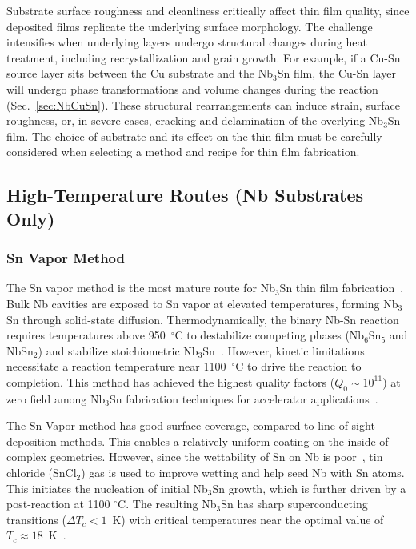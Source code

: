     Substrate surface roughness and cleanliness critically affect thin film quality, since deposited films replicate the underlying surface morphology. The challenge intensifies when underlying layers undergo structural changes during heat treatment, including recrystallization and grain growth. For example, if a Cu-Sn source layer sits between the Cu substrate and the Nb$_3$Sn film, the Cu-Sn layer will undergo phase transformations and volume changes during the reaction (Sec.~\ref{sec:NbCuSn}). These structural rearrangements can induce strain, surface roughness, or, in severe cases, cracking and delamination of the overlying Nb$_3$Sn film. The choice of substrate and its effect on the thin film must be carefully considered when selecting a method and recipe for thin film fabrication.
    
    \subsection{High-Temperature Routes (Nb Substrates Only)}
    
    \subsubsection{Sn Vapor Method} \label{sec:Snvapordetail}

    The Sn vapor method is the most mature route for Nb$_3$Sn thin film fabrication~\cite{peinigerNb3SnSUPERCONDUCTINGACCELERATORS1989,posenMeasurementHighQuality2022}. Bulk Nb cavities are exposed to Sn vapor at elevated temperatures, forming Nb$_3$Sn through solid-state diffusion. Thermodynamically, the binary Nb-Sn reaction requires temperatures above 950~$^\circ$C to destabilize competing phases (Nb$_6$Sn$_5$ and NbSn$_2$) and stabilize stoichiometric Nb$_3$Sn~\cite{xuxingchenReviewProspectsNb3Sn2017}. However, kinetic limitations necessitate a reaction temperature near 1100~$^\circ$C to drive the reaction to completion. This method has achieved the highest quality factors ($Q_0 \sim 10^{11}$) at zero field among Nb$_3$Sn fabrication techniques for accelerator applications~\cite{Posen:2018zjb}.

    The Sn Vapor method has good surface coverage, compared to line-of-sight deposition methods. This enables a relatively uniform coating on the inside of complex geometries. However, since the wettability of Sn on Nb is poor~\cite{heinSuperconductingIntermetallicCompounds1973}, tin chloride (SnCl$_2$) gas is used to improve wetting and help seed Nb with Sn atoms. This initiates the nucleation of initial Nb$_3$Sn growth, which is further driven by a post-reaction at 1100 $^\circ$C. The resulting Nb$_3$Sn has sharp superconducting transitions ($\Delta T_c < 1$~K) with critical temperatures near the optimal value of $T_c\approx18$~K~\cite{Posen:2018zjb}.
    
